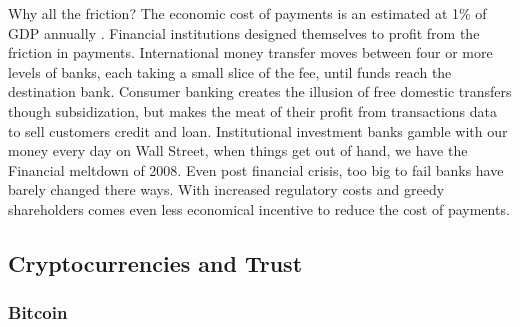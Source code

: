 \documentclass[a4paper,12pt]{article} %
\begin{document}
Why all the friction? The economic cost of payments is an estimated at 1\% of GDP annually \cite{kaarmann2013cost}. Financial institutions designed themselves to profit from the friction in payments. International money transfer moves between four or more levels of banks, each taking a small slice of the fee, until funds reach the destination bank. Consumer banking creates the illusion of free domestic transfers though subsidization, but makes the meat of their profit from transactions data to sell customers credit and loan. Institutional investment banks gamble with our money every day on Wall Street, when things get out of hand, we have the Financial meltdown of 2008. Even post financial crisis, too big to fail banks have barely changed there ways. With increased regulatory costs and greedy shareholders comes even less economical incentive to reduce the cost of payments.

\subsection{Cryptocurrencies and Trust} \label{ssec:2:cryptocurrencies}

\subsubsection{Bitcoin} \label{sssec:2:bitcoin}
\end{document}

